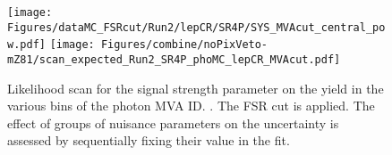 \begin{figure}
  \centering
  \texttt{[image: Figures/dataMC\_FSRcut/Run2/lepCR/SR4P/SYS\_MVAcut\_central\_pow.pdf]}
  \hfill
  \texttt{[image: Figures/combine/noPixVeto-mZ81/scan\_expected\_Run2\_SR4P\_phoMC\_lepCR\_MVAcut.pdf]}
  \caption{Likelihood scan for the signal strength parameter
    on the yield in the various bins of the photon MVA ID.
    .
    The FSR cut is applied.
    The effect of groups of nuisance parameters on the uncertainty is assessed by sequentially fixing their value in the fit.
  }
  \label{fig:scan_FSRcut_Run2_SR4P_phoMC_lepCR_MVAcut}
\end{figure}
